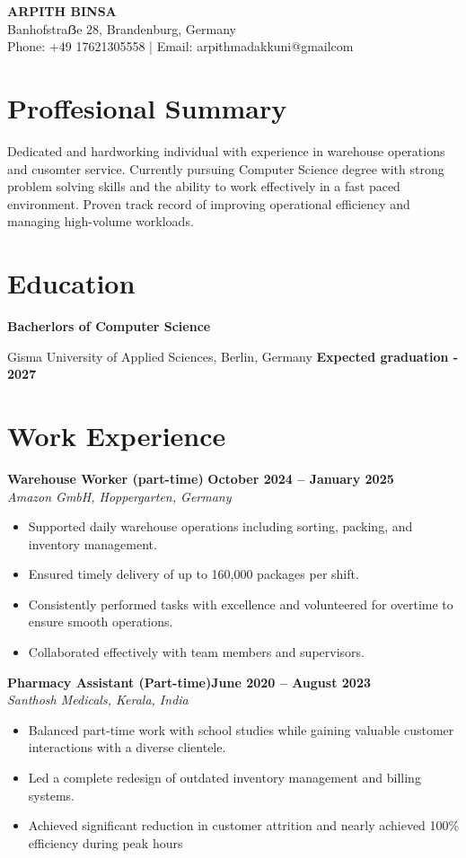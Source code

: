 \documentclass[11pt,a4paper]{article}
\begin{document}
\begin{center}
{\large\bfseries ARPITH BINSA}\\[8pt]
Banhofstraẞe 28, Brandenburg, Germany\\
Phone: +49 17621305558 | Email: arpithmadakkuni@gmailcom
\end{center}

\vspace{10pt}
\section{Proffesional Summary}
Dedicated and hardworking individual with experience in warehouse operations and cusomter service. Currently pursuing Computer Science degree with strong problem solving skills and the ability to work effectively in a fast paced environment. Proven track record of improving operational efficiency and managing high-volume workloads.

\section{Education}
\textbf{Bacherlors of Computer Science} \hfill

Gisma University of Applied Sciences, Berlin, Germany
\textbf{Expected graduation - 2027}
\section{Work Experience}
\textbf{Warehouse Worker (part-time)}\hfill
\textbf{October 2024 -- January 2025}\\
\textit{Amazon GmbH, Hoppergarten, Germany}
\begin{itemize}
    \item Supported daily warehouse operations including sorting, packing, and inventory management.
    \item Ensured timely delivery of up to 160,000 packages per shift.
    \item Consistently performed tasks with excellence and volunteered for overtime to ensure smooth operations.
    \item Collaborated effectively with team members and supervisors.
    \end{itemize}

\textbf{Pharmacy Assistant (Part-time)}\hfill \textbf{June 2020 -- August 2023}\\
\textit{Santhosh Medicals, Kerala, India}
\begin{itemize}
    \item Balanced part-time work with school studies while gaining valuable customer interactions with a diverse clientele.
    \item Led a complete redesign of outdated inventory management and billing systems.
    \item Achieved significant reduction in customer attrition and nearly achieved 100\% efficiency during peak hours \
\end{itemize}
\end{document}

